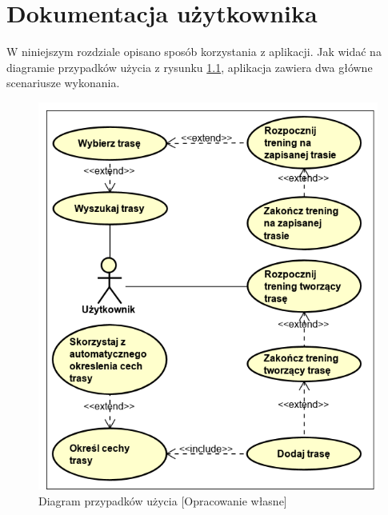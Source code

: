 \chapter{Dokumentacja użytkownika}\label{chap:dokumentacja-uzytkownika}
W niniejszym rozdziale opisano sposób korzystania z aplikacji. Jak widać na diagramie przypadków użycia z rysunku \ref{image:przypadki-uzycia}, aplikacja zawiera dwa główne scenariusze wykonania.
\begin{figure}[h]\label{fig:xamarin_model}
\begin{center}
\includegraphics{img/przypadki-uzycia.png}
\caption{Diagram przypadków użycia [Opracowanie własne]}\label{image:przypadki-uzycia}
\end{center}
\end{figure}

